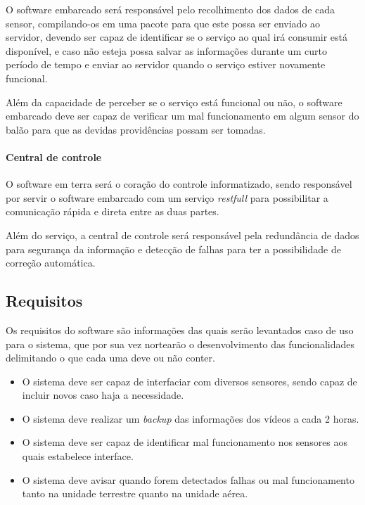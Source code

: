 O software embarcado será responsável pelo recolhimento dos dados de cada sensor, compilando-os em uma pacote para que este possa ser enviado ao servidor, devendo ser capaz de identificar se o serviço ao qual irá consumir está disponível, e caso não esteja possa salvar as informações durante um curto período de tempo e enviar ao servidor quando o serviço estiver novamente funcional.

Além da capacidade de perceber se o serviço está funcional ou não, o software embarcado deve ser capaz de verificar um mal funcionamento em algum sensor do balão para que as devidas providências possam ser tomadas.

\paragraph{Central de controle}

O software em terra será o coração do controle informatizado, sendo responsável por servir o software embarcado com um serviço \textit{restfull} para possibilitar a comunicação rápida e direta entre as duas partes.

Além do serviço, a central de controle será responsável pela redundância de dados para segurança da informação e detecção de falhas para ter a possibilidade de correção automática.

\subsection{Requisitos}

Os requisitos do software são informações das quais serão levantados caso de uso para o sistema, que por sua vez nortearão o desenvolvimento das funcionalidades delimitando o que cada uma deve ou não conter.

\begin{itemize}
  \item O sistema deve ser capaz de interfaciar com diversos sensores, sendo capaz de incluir novos caso haja a necessidade.
  \item O sistema deve realizar um \textit{backup} das informações dos vídeos a cada 2 horas.
  \item O sistema deve ser capaz de identificar mal funcionamento nos sensores aos quais estabelece interface.
  \item O sistema deve avisar quando forem detectados falhas ou mal funcionamento tanto na unidade terrestre quanto na unidade aérea.
\end{itemize}
